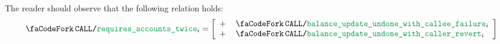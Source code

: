 \saNote{}\label{hub: scenario: note: calls that require both accounts twice partition} The reader should observe that the following relation holds:
\[
	\scenCallRequiresAccountsTwice _{i}
	=
	\left[ \begin{array}{cl}
		+ & \scenCallBalanceUpdateUndoneWithCalleeFailure  _{i} \\
		+ & \scenCallBalanceUpdateUndoneWithCallerRevert   _{i} \\
	\end{array} \right]
\]
